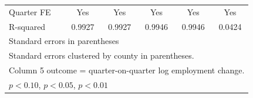 \begin{table}[htbp]
\begin{tabular}{l*{5}{c}}
Quarter FE  &         Yes         &         Yes         &         Yes         &         Yes         &         Yes         \\
R-squared   &      0.9927         &      0.9927         &      0.9946         &      0.9946         &      0.0424         \\
\bottomrule
\multicolumn{6}{l}{\footnotesize Standard errors in parentheses}\\
\multicolumn{6}{l}{\footnotesize Standard errors clustered by county in parentheses.}\\
\multicolumn{6}{l}{\footnotesize Column 5 outcome = quarter-on-quarter log employment change.}\\
\multicolumn{6}{l}{\footnotesize \sym{*} \(p<0.10\), \sym{**} \(p<0.05\), \sym{***} \(p<0.01\)}\\
\end{tabular}
\end{table}
